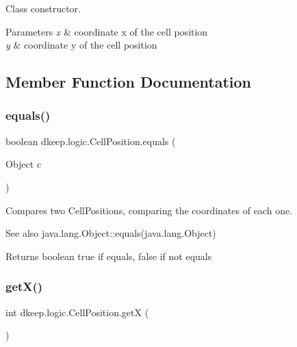 Class constructor.


\begin{DoxyParams}{Parameters}
{\em x} & coordinate x of the cell position \\
\hline
{\em y} & coordinate y of the cell position \\
\hline
\end{DoxyParams}


\subsection{Member Function Documentation}
\mbox{\label{classdkeep_1_1logic_1_1_cell_position_a34989dd6791daf03e71ded888b5d8ac0}} 
\subsubsection{\texorpdfstring{equals()}{equals()}}
{\footnotesize\ttfamily boolean dkeep.\+logic.\+Cell\+Position.\+equals (\begin{DoxyParamCaption}\item[{Object}]{c }\end{DoxyParamCaption})}

Compares two Cell\+Positions, comparing the coordinates of each one. \begin{DoxySeeAlso}{See also}
java.\+lang.\+Object\+::equals(java.\+lang.\+Object) 
\end{DoxySeeAlso}
\begin{DoxyReturn}{Returns}
boolean true if equals, false if not equals 
\end{DoxyReturn}
\mbox{\label{classdkeep_1_1logic_1_1_cell_position_a12e6d155288b9f263dfca84369ff46ce}} 
\subsubsection{\texorpdfstring{get\+X()}{getX()}}
{\footnotesize\ttfamily int dkeep.\+logic.\+Cell\+Position.\+getX (\begin{DoxyParamCaption}{ }\end{DoxyParamCaption})}

